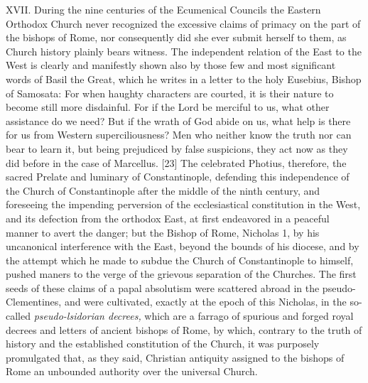 XVII. During the nine centuries of the Ecumenical Councils the Eastern
Orthodox Church never recognized the excessive claims of primacy on the
part of the bishops of Rome, nor consequently did she ever submit
herself to them, as Church history plainly bears witness. The
independent relation of the East to the West is clearly and manifestly
shown also by those few and most significant words of Basil the Great,
which he writes in a letter to the holy Eusebius, Bishop of Samosata:
\textquotesingle For when haughty characters are courted, it is their
nature to become still more disdainful. For if the Lord be merciful to
us, what other assistance do we need? But if the wrath of God abide on
us, what help is there for us from Western superciliousness? Men who
neither know the truth nor can bear to learn it, but being prejudiced by
false suspicions, they act now as they did before in the case of
Marcellus.\textquotesingle{} {[}23{]} The celebrated Photius, therefore,
the sacred Prelate and luminary of Constantinople, defending this
independence of the Church of Constantinople after the middle of the
ninth century, and foreseeing the impending perversion of the
ecclesiastical constitution in the West, and its defection from the
orthodox East, at first endeavored in a peaceful manner to avert the
danger; but the Bishop of Rome, Nicholas 1, by his uncanonical
interference with the East, beyond the bounds of his diocese, and by the
attempt which he made to subdue the Church of Constantinople to himself,
pushed maners to the verge of the grievous separation of the Churches.
The first seeds of these claims of a papal absolutism were scattered
abroad in the pseudo-Clementines, and were cultivated, exactly at the
epoch of this Nicholas, in the so-called \emph{pseudo-lsidorian
decrees,} which are a farrago of spurious and forged royal decrees and
letters of ancient bishops of Rome, by which, contrary to the truth of
history and the established constitution of the Church, it was purposely
promulgated that, as they said, Christian antiquity assigned to the
bishops of Rome an unbounded authority over the universal Church.

